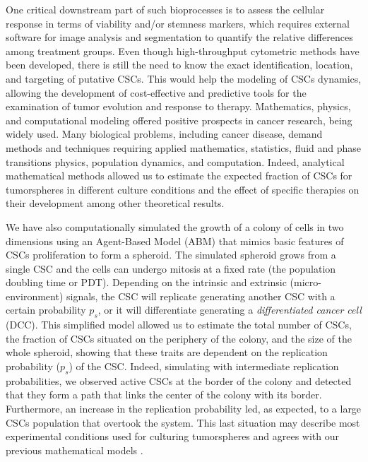 \documentclass[fleqn,10pt]{wlscirep}
\begin{document}
One critical downstream part of such bioprocesses is to assess the cellular response in terms of viability and/or stemness markers, which requires external software for image analysis and segmentation to quantify the relative differences among treatment groups. Even though high-throughput cytometric methods have been developed\cite{Kessel}, there is still the need to know the exact identification, location, and targeting of putative CSCs. This would help the modeling of CSCs dynamics, allowing the development of cost-effective and predictive tools for the examination of tumor evolution and response to therapy.
%
Mathematics, physics, and computational modeling offered positive prospects in cancer research, being widely used. Many biological problems, including cancer disease, demand methods and techniques requiring applied mathematics, statistics, fluid and phase transitions physics, population dynamics, and computation\cite{laporta, bull2022hallmarks, Vieira}. Indeed, analytical mathematical methods allowed us to estimate the expected fraction of CSCs for tumorspheres in different culture conditions\cite{benitez2019, barberis2021diff, benitez2021} and the effect of specific therapies on their development\cite{fotinos23} among other theoretical results\cite{Condat2006, Delsanto2008, Menchon2011, Barberis2015}.  

We have also computationally simulated the growth of a colony of cells in two dimensions using an Agent-Based Model (ABM) that mimics basic features of CSCs proliferation to form a spheroid\cite{barberis2021percolation}. The simulated spheroid grows from a single CSC and the cells can undergo mitosis at a fixed rate (the population doubling time or PDT). Depending on the intrinsic and extrinsic (micro-environment) signals, the CSC will replicate generating another CSC with a certain probability $p_s$, or it will differentiate generating a \emph{differentiated cancer cell} (DCC). This simplified model allowed us to estimate the total number of CSCs, the fraction of CSCs situated on the periphery of the colony, and the size of the whole spheroid, showing that these traits are dependent on  the replication probability ($p_s$) of the CSC. Indeed, simulating with intermediate replication probabilities, we observed active CSCs at the border of the colony and detected that they form a path that links the center of the colony with its border. Furthermore, an increase in the replication probability led, as expected, to a large CSCs population that overtook the system. This last situation may describe most experimental conditions used for culturing tumorspheres \cite{chen2016,wang2016, Dontu, Leis, Marks2024} and agrees with our previous mathematical models \cite{benitez2019, barberis2021diff, benitez2021}.
\end{document}
